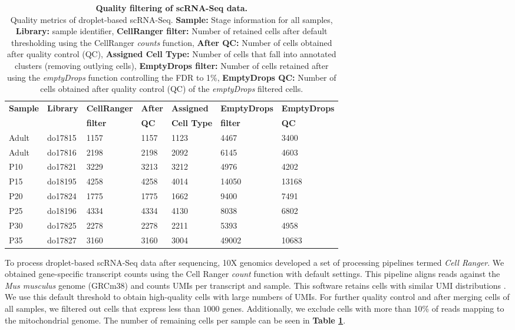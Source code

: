 \begin{table}[ht	]
\centering
\caption[Quality filtering of scRNA-Seq data]{\textbf{Quality filtering of scRNA-Seq data.} \\
Quality metrics of droplet-based scRNA-Seq. \textbf{Sample:} Stage information for all samples, \textbf{Library:} sample identifier, \textbf{CellRanger filter:} Number of retained cells after default thresholding using the CellRanger \emph{counts} function,  \textbf{After QC:} Number of cells obtained after quality control (QC), \textbf{Assigned Cell Type:} Number of cells that fall into annotated clusters (removing outlying cells), \textbf{EmptyDrops filter:} Number of cells retained after using the \emph{emptyDrops} function controlling the FDR to 1\%, \textbf{EmptyDrops QC:} Number of cells obtained after quality control (QC) of the \emph{emptyDrops} filtered cells.}
\label{tab3:QC_scRNAseq}
\begin{tabular}{lllllll}
\toprule
\textbf{Sample} & \textbf{Library} & \textbf{CellRanger} & \textbf{After} & \textbf{Assigned} & \textbf{EmptyDrops} & \textbf{EmptyDrops} \\
& & \textbf{filter} & \textbf{QC} & \textbf{Cell Type} & \textbf{filter} & \textbf{QC} \\
\midrule
Adult & do17815 & 1157 & 1157 & 1123 & 4467 & 3400 \\
\midrule
Adult & do17816 & 2198 & 2198 & 2092 & 6145 & 4603 \\
\midrule
P10 & do17821 & 3229 & 3213 & 3212 & 4976 & 4202 \\
\midrule
P15 & do18195 & 4258 & 4258 & 4014 & 14050 & 13168 \\
\midrule
P20 & do17824 & 1775 & 1775 & 1662 & 9400 & 7491 \\
\midrule
P25 & do18196 & 4334 & 4334 & 4130 & 8038 & 6802 \\
\midrule
P30 & do17825 & 2278 & 2278 & 2211 & 5393 & 4958 \\
\midrule
P35 & do17827 & 3160 & 3160 & 3004 & 49002 & 10683 \\                 
\bottomrule   
\end{tabular}
\end{table}

To process droplet-based scRNA-Seq data after sequencing, 10X genomics\texttrademark{} developed a set of processing pipelines termed \textit{Cell Ranger}. We obtained gene-specific transcript counts using the Cell Ranger \emph{count} function with default settings. This pipeline aligns reads against the \emph{Mus musculus} genome (GRCm38) and counts UMIs per transcript and sample. This software retains cells with similar UMI distributions \citep{Zheng2017}. We use this default threshold to obtain high-quality cells with large numbers of UMIs. For further quality control and after merging cells of all samples, we filtered out cells that express less than 1000 genes. Additionally, we exclude cells with more than 10\% of reads mapping to the mitochondrial genome. The number of remaining cells per sample can be seen in \textbf{Table \ref{tab3:QC_scRNAseq}}.\\

